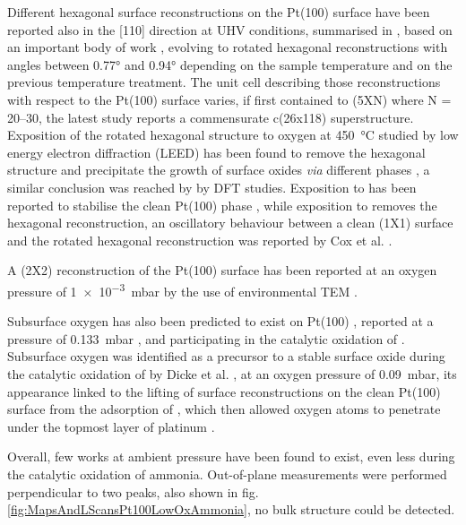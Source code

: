 Different hexagonal surface reconstructions on the Pt(100) surface have been reported also in the [110] direction at UHV conditions, summarised in \cite{Hammer2016}, based on an important body of work \parencite{Heilmann1979, Vanhove1981, Heinz1982, Mase1992, Kuhnke1992, Borg1994, VanBeurden2004, Havu2010}, evolving to rotated hexagonal reconstructions with angles between \ang{0.77} and \ang{0.94} depending on the sample temperature and on the previous temperature treatment.
The unit cell describing those reconstructions with respect to the Pt(100) surface varies, if first contained to (5XN) where N = 20–30, the latest study reports a commensurate c(26x118) superstructure.
Exposition of the rotated hexagonal structure to oxygen at \qty{450}{\degreeCelsius} studied by low energy electron diffraction (LEED) has been found to remove the hexagonal structure and precipitate the growth of surface oxides \textit{via} different phases \parencite{BradleyShumbera2007, BradleyShumbera2007a}, a similar conclusion was reached by \cite{Deskins2005} by DFT studies.
Exposition to  has been reported to stabilise the clean Pt(100) phase \parencite{Heinz1982}, while exposition to  removes the hexagonal reconstruction, an oscillatory behaviour between a clean (1X1) surface and the rotated hexagonal reconstruction was reported by Cox et al. \parencite*{Cox1983}.

A (2X2) reconstruction of the Pt(100) surface has been reported at an oxygen pressure of \qty{1e-3}{mbar} by the use of environmental TEM \parencite{Li2016}.

Subsurface oxygen has also been predicted to exist on Pt(100) \parencite{Gu2007}, reported at a pressure of \qty{0.133}{\milli\bar} \parencite{McMillan2005}, and participating in the catalytic oxidation of .
Subsurface oxygen was identified as a precursor to a stable surface oxide during the catalytic oxidation of  by Dicke et al. \parencite*{Dicke2000}, at an oxygen pressure of \qty{0.09}{\milli\bar}, its appearance linked to the lifting of surface reconstructions on the clean Pt(100) surface from the adsorption of , which then allowed oxygen atoms to penetrate under the topmost layer of platinum \parencite{Rotermund1993, Lauterbach1994}.

Overall, few works at ambient pressure have been found to exist, even less during the catalytic oxidation of ammonia.
Out-of-plane measurements were performed perpendicular to two peaks, also shown in fig. \ref{fig:MapsAndLScansPt100LowOxAmmonia}, no bulk structure could be detected.

